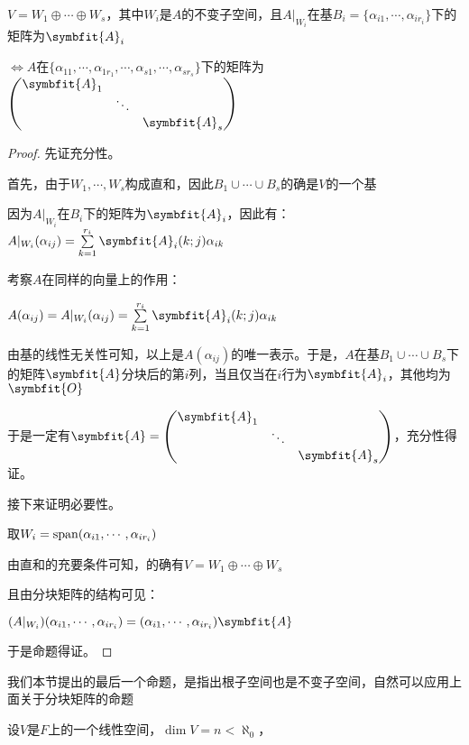 \documentclass[12pt, a4paper, oneside, UTF8]{ctexbook}
\begin{document}
\begin{para}{0}
\begin{proposition}
						$V = W_1 \oplus \cdots \oplus W_s$，其中$W_i$是$A$的不变子空间，且$A|_{W_i}$在基$B_i=\{\alpha_{i1},\cdots,\alpha_{ir_i}\}$下的矩阵为$\symbfit{A}_i$

						$\Leftrightarrow A$在$\{\alpha_{11},\cdots,\alpha_{1r_1},\cdots,\alpha_{s1},\cdots,\alpha_{sr_s}\}$下的矩阵为$\begin{pmatrix}
							\symbfit{A}_1 & &   \\
							& \ddots &  \\
							& &  \symbfit{A}_s
						\end{pmatrix}$
					\end{proposition}
					\begin{proof}
						先证充分性。

						首先，由于$W_1,\cdots,W_s$构成直和，因此$B_1 \cup \cdots \cup B_s$的确是$V$的一个基

						因为$A|_{W_i}$在$B_i$下的矩阵为$\symbfit{A}_i$，因此有：$A|_{W_i}(\alpha_{ij}) = \sum\limits_{k=1}^{r_i} \symbfit{A}_i (k;j)\alpha_{ik}$

						考察$A$在同样的向量上的作用：

						$A(\alpha_{ij})=A|_{W_i}(\alpha_{ij}) = \sum\limits_{k=1}^{r_i} \symbfit{A}_i (k;j)\alpha_{ik}$

						由基的线性无关性可知，以上是$A(\alpha_{ij})$的唯一表示。于是，$A$在基$B_1 \cup \cdots \cup B_s$下的矩阵$\symbfit{A}$分块后的第$i$列，当且仅当在$i$行为$\symbfit{A}_i$，其他均为$\symbfit{O}$

						于是一定有$\symbfit{A}=\begin{pmatrix}
							\symbfit{A}_1 & &   \\
							& \ddots &  \\
							& &  \symbfit{A}_s
						\end{pmatrix}$，充分性得证。

						接下来证明必要性。

						取$W_i = \operatorname{span}(\alpha_{i1},\cdots,\alpha_{ir_i})$

						由直和的充要条件可知，的确有$V = W_1 \oplus \cdots \oplus W_s$

						且由分块矩阵的结构可见：

						$(A|_{W_i})(\alpha_{i1},\cdots,\alpha_{ir_i})=(\alpha_{i1},\cdots,\alpha_{ir_i})\symbfit{A}$

						于是命题得证。
					\end{proof}
				\point{}
					我们本节提出的最后一个命题，是指出根子空间也是不变子空间，自然可以应用上面关于分块矩阵的命题
					\begin{proposition}
						设$V$是$F$上的一个线性空间，$\dim V = n < \aleph_0$，


\end{proposition}
\end{para}
\end{document}
